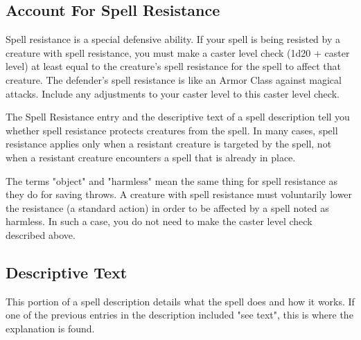 \subsection{Account For Spell Resistance}

Spell resistance is a special defensive ability. If your spell is being resisted 
by a creature with spell resistance, you must make a caster level check (1d20 + 
caster level) at least equal to the creature's spell resistance for the spell to 
affect that creature. The defender's spell resistance is like an Armor Class against 
magical attacks. Include any adjustments to your caster level to this caster level 
check.

The Spell Resistance entry and the descriptive text of a spell description tell 
you whether spell resistance protects creatures from the spell. In many cases, 
spell resistance applies only when a resistant creature is targeted by the spell, 
not when a resistant creature encounters a spell that is already in place.

The terms "object" and "harmless" mean the same thing for spell resistance 
as they do for saving throws. A creature with spell resistance must voluntarily 
lower the resistance (a standard action) in order to be affected by a spell noted 
as harmless. In such a case, you do not need to make the caster level check described 
above.

\subsection{Descriptive Text}

This portion of a spell description details what the spell does and how it works. 
If one of the previous entries in the description included "see text", this is 
where the explanation is found. 
